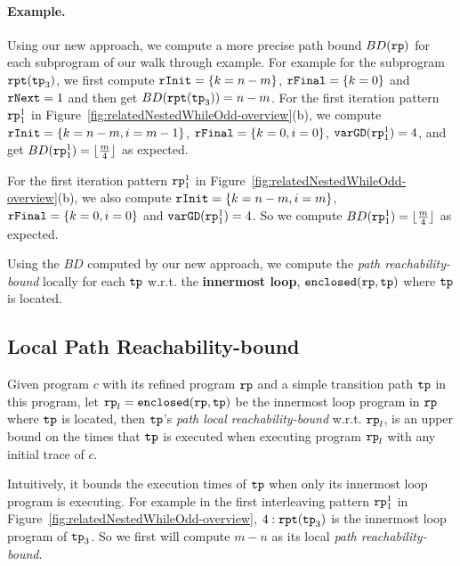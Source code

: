 \paragraph{Example.}
Using our new approach, we compute a more precise path bound $BD(\mathtt{rp})$ for each subprogram of our walk through example. 
For example for the subprogram $\mathtt{rpt}(\mathtt{tp}_3)$, we first compute $\mathtt{rInit} = \{k = n - m\}$, $\mathtt{rFinal} = \{k = 0\}$ and $\mathtt{rNext} = 1$ and then get $BD(\mathtt{rpt}(\mathtt{tp}_3)) = n - m$.
For the first iteration pattern $\mathtt{rp}_1^1$ in Figure~\ref{fig:relatedNestedWhileOdd-overview}(b), we compute 
$\mathtt{rInit} = \{k = n - m, i = m - 1\}$, $\mathtt{rFinal} = \{k = 0, i = 0\}$, $\mathtt{varGD}(\mathtt{rp}_1^1) = 4$, and get $BD(\mathtt{rp}_1^1) = \lfloor \frac{m}{4} \rfloor $ as expected.



For the first iteration pattern $\mathtt{rp}_1^1$ in Figure~\ref{fig:relatedNestedWhileOdd-overview}(b), we also compute 
$\mathtt{rInit} = \{k = n - m, i = m\}$, $\mathtt{rFinal} = \{k = 0, i = 0\}$ and $\mathtt{varGD}(\mathtt{rp}_1^1) = 4$. So we compute $BD(\mathtt{rp}_1^1) = \lfloor \frac{m}{4} \rfloor $ as expected.

Using the $BD$ computed by our new approach, we compute the \emph{path reachability-bound} locally for
each $\mathtt{tp}$ w.r.t. the \textbf{innermost loop}, $\mathtt{enclosed}(\mathtt{rp}, \mathtt{tp})$ where $\mathtt{tp}$ is located.

\subsection{Local Path Reachability-bound}

\begin{defn}
  Given program $c$ with its refined program $\mathtt{rp}$ and a simple transition path $\mathtt{tp}$ in this program, 
  let $\mathtt{rp}_l = \mathtt{enclosed}(\mathtt{rp}, \mathtt{tp})$ be the innermost loop program in $\mathtt{rp}$ where $\mathtt{tp}$ is located,
  then $\mathtt{tp}$'s \emph{path local reachability-bound} w.r.t. $\mathtt{rp}_l$, 
  is an upper bound on the times that $\mathtt{tp}$ is executed when executing program $\mathtt{rp}_l$ with any initial trace of $c$.
 \end{defn}
 Intuitively, it bounds the execution times of $\mathtt{tp}$ when only its innermost loop program is executing.
 For example in the first interleaving pattern $\mathtt{rp}_1^1$ in Figure~\ref{fig:relatedNestedWhileOdd-overview}, 
 $4:\mathtt{rpt}(\mathtt{tp}_3)$ is the innermost loop program of $\mathtt{tp}_3$.
 So we first will compute $m - n$ as its local \emph{path reachability-bound}.

